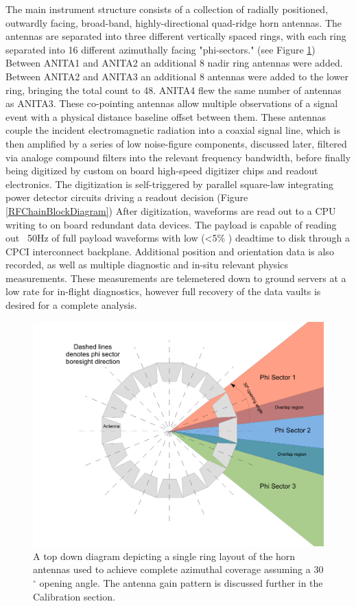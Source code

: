 	The main instrument structure consists of a collection of radially positioned, outwardly facing, broad-band, highly-directional quad-ridge horn antennas.  The antennas are separated into three different vertically spaced rings, with each ring separated into 16 different azimuthally facing "phi-sectors." (see Figure \ref{fig:phiSectors})  Between ANITA1 and ANITA2 an additional 8 nadir ring antennas were added.  Between ANITA2 and ANITA3 an additional 8 antennas were added to the lower ring, bringing the total count to 48.  ANITA4 flew the same number of antennas as ANITA3.  These co-pointing antennas allow multiple observations of a signal event with a physical distance baseline offset between them. These antennas couple the incident electromagnetic radiation into a coaxial signal line, which is then amplified by a series of low noise-figure components, discussed later, filtered via analoge compound filters into the relevant frequency bandwidth, before finally being digitized by custom on board high-speed digitizer chips and readout electronics.  The digitization is self-triggered by parallel square-law integrating power detector circuits driving a readout decision (Figure \ref{RFChainBlockDiagram}) After digitization, waveforms are read out to a CPU writing to on board redundant data devices.  The payload is capable of reading out ~50Hz of full payload waveforms with low (\textless 5\% ) deadtime to disk through a CPCI interconnect backplane.  Additional position and orientation data is also recorded, as well as multiple diagnostic and in-situ relevant physics measurements.  These measurements are telemetered down to ground servers at a low rate for in-flight diagnostics, however full recovery of the data vaults is desired for a complete analysis.
	
	
\begin{figure}
\centering
	\includegraphics[width=\textwidth]{figures/phiSectors}
	\caption{A top down diagram depicting a single ring layout of the horn antennas used to achieve complete azimuthal coverage assuming a 30$^{\circ}$  opening angle.  The antenna gain pattern is discussed further in the Calibration section.}
	\label{fig:phiSectors}
\end{figure}

